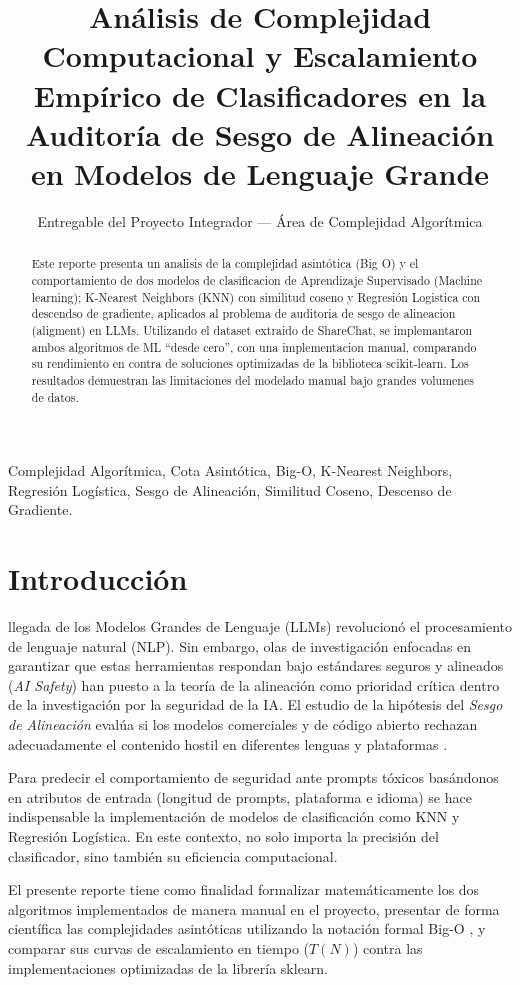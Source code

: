 \documentclass[twocolumn,10pt,journal]{IEEEtran}
\title{Análisis de Complejidad Computacional y Escalamiento Empírico de Clasificadores en la Auditoría de Sesgo de Alineación en Modelos de Lenguaje Grande}
\author{Entregable del Proyecto Integrador --- Área de Complejidad Algorítmica}
\begin{document}
\maketitle
\begin{abstract}
Este reporte presenta un analisis de la complejidad asintótica (Big O) y el comportamiento de dos modelos de clasificacion de Aprendizaje Supervisado (Machine learning); K-Nearest Neighbors (KNN) con similitud coseno y Regresión Logistica con descendso de gradiente, aplicados al problema de auditoria de sesgo de alineacion (aligment) en LLMs. Utilizando el dataset extraido de ShareChat, se implemantaron ambos algoritmos de ML “desde cero”, con una implementacion manual, comparando su rendimiento en contra de soluciones optimizadas de la biblioteca scikit-learn. Los resultados demuestran las limitaciones del modelado manual bajo grandes volumenes de datos.
\end{abstract}

\begin{IEEEkeywords}
Complejidad Algorítmica, Cota Asintótica, Big-O, K-Nearest Neighbors, Regresión Logística, Sesgo de Alineación, Similitud Coseno, Descenso de Gradiente.
\end{IEEEkeywords}

\section{Introducción}

 llegada de los Modelos Grandes de Lenguaje (LLMs) revolucionó el procesamiento de lenguaje natural (NLP). Sin embargo, olas de investigación enfocadas en garantizar que estas herramientas respondan bajo estándares seguros y alineados (\textit{AI Safety}) han puesto a la teoría de la alineación como prioridad crítica dentro de la investigación por la seguridad de la IA. El estudio de la hipótesis del \textit{Sesgo de Alineación} evalúa si los modelos comerciales y de código abierto rechazan adecuadamente el contenido hostil en diferentes lenguas y plataformas \cite{ouyang2022}.

Para predecir el comportamiento de seguridad ante prompts tóxicos basándonos en atributos de entrada (longitud de prompts, plataforma e idioma) se hace indispensable la implementación de modelos de clasificación como KNN y Regresión Logística. En este contexto, no solo importa la precisión del clasificador, sino también su eficiencia computacional. 

El presente reporte tiene como finalidad formalizar matemáticamente los dos algoritmos implementados de manera manual en el proyecto, presentar de forma científica las complejidades asintóticas utilizando la notación formal Big-O \cite{knuth1976}, y comparar sus curvas de escalamiento en tiempo ($T(N)$) contra las implementaciones optimizadas de la librería sklearn.
\end{document}
